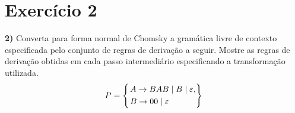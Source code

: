 \documentclass[11pt,portuguese]{fphw}
\begin{document}
		\section*{Exercício 2}
			\begin{problem}
				\textbf{2) }Converta para forma normal de Chomsky a gramática livre de contexto 
				especificada pelo conjunto de regras de derivação a  seguir. Mostre as 						regras
				de derivação obtidas em cada passo intermediário especificando a 
				transformação utilizada.
				\linebreak
				$$
					P = \begin{dcases}
						\begin{rcases}
						A \rightarrow BAB \mid B \mid \varepsilon,\\
						B \rightarrow 00 \mid \varepsilon
						\end{rcases}
					\end{dcases}
				$$
			\end{problem}
\end{document}
